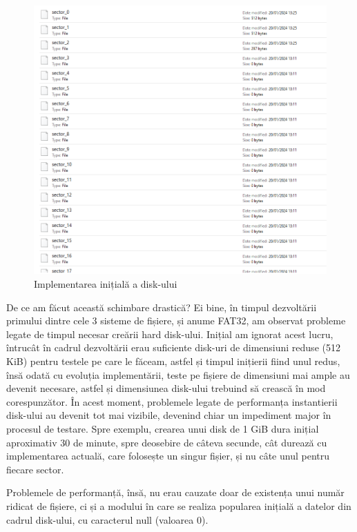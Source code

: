 \bigskip

\begin{figure}[h]
    \centering
    \includegraphics[width=1.0\linewidth]{images/2.3.png}
    \caption{Implementarea inițială a disk-ului}
    \label{fig:enter-label}
\end{figure}

\bigskip

De ce am făcut această schimbare drastică? Ei bine, în timpul dezvoltării primului dintre cele 3 sisteme de fișiere, și anume FAT32, am observat probleme legate de timpul necesar creării hard disk-ului. Inițial am ignorat acest lucru, întrucât în cadrul dezvoltării erau suficiente disk-uri de dimensiuni reduse (512 KiB) pentru testele pe care le făceam, astfel și timpul inițierii fiind unul redus, însă odată cu evoluția implementării, teste pe fișiere de dimensiuni mai ample au devenit necesare, astfel și dimensiunea disk-ului trebuind să crească în mod corespunzător. În acest moment, problemele legate de performanța instantierii disk-ului au devenit tot mai vizibile, devenind chiar un impediment major în procesul de testare. Spre exemplu, crearea unui disk de 1 GiB dura inițial aproximativ 30 de minute, spre deosebire de câteva secunde, cât durează cu implementarea actuală, care folosește un singur fișier, și nu câte unul pentru fiecare sector.

Problemele de performanță, însă, nu erau cauzate doar de existența unui număr ridicat de fișiere, ci și a modului în care se realiza popularea inițială a datelor din cadrul disk-ului, cu caracterul null (valoarea 0).

